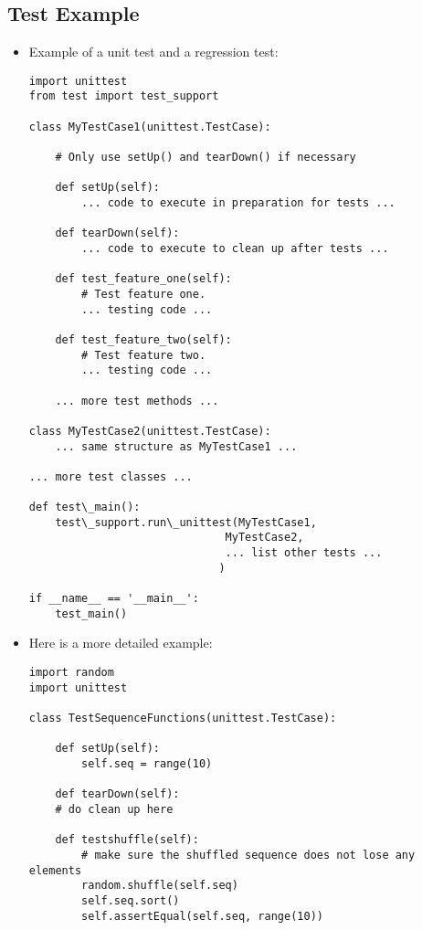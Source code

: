 \subsection{Test Example}
\begin{itemize}

  \item
    Example of a unit test and a regression test:
    \color[named]{OliveGreen}
    \begin{verbatim}import unittest
from test import test_support

class MyTestCase1(unittest.TestCase):

    # Only use setUp() and tearDown() if necessary

    def setUp(self):
        ... code to execute in preparation for tests ...

    def tearDown(self):
        ... code to execute to clean up after tests ...

    def test_feature_one(self):
        # Test feature one.
        ... testing code ...

    def test_feature_two(self):
        # Test feature two.
        ... testing code ...

    ... more test methods ...

class MyTestCase2(unittest.TestCase):
    ... same structure as MyTestCase1 ...

... more test classes ...

def test\_main():
    test\_support.run\_unittest(MyTestCase1,
                              MyTestCase2,
                              ... list other tests ...
                             )

if __name__ == '__main__':
    test_main()
    \end{verbatim}
    \normalcolor

  \item Here is a more detailed example:    
    \color[named]{OliveGreen}
    \begin{verbatim}import random
import unittest

class TestSequenceFunctions(unittest.TestCase):
    
    def setUp(self):
        self.seq = range(10)

    def tearDown(self):
	# do clean up here

    def testshuffle(self):
        # make sure the shuffled sequence does not lose any elements
        random.shuffle(self.seq)
        self.seq.sort()
        self.assertEqual(self.seq, range(10))


\end{verbatim}
\end{itemize}

